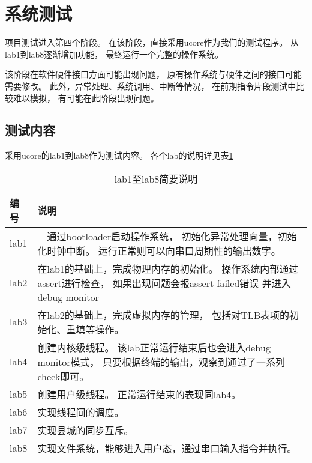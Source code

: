 \section{系统测试}
    项目测试进入第四个阶段。%
    在该阶段，直接采用ucore作为我们的测试程序。%
    从lab1到lab8逐渐增加功能，%
    最终运行一个完整的操作系统。

    该阶段在软件硬件接口方面可能出现问题，%
    原有操作系统与硬件之间的接口可能需要修改。%
    此外，异常处理、系统调用、中断等情况，%
    在前期指令片段测试中比较难以模拟，%
    有可能在此阶段出现问题。

    \subsection{测试内容}
        采用ucore的lab1到lab8作为测试内容。
        各个lab的说明详见表\ref{os_lab}
        \begin{table}[!hbp]
            \centering
            \caption{lab1至lab8简要说明}
            \label{os_lab}
            \begin{tabularx}{\textwidth}{|l|X|}
            \hline
            编号 & 说明 \\
            \hline
            lab1 &　通过bootloader启动操作系统，
                    初始化异常处理向量，初始化时钟中断。
                    运行正常则可以向串口周期性的输出数字。 \\
            \hline
            lab2 & 在lab1的基础上，完成物理内存的初始化。
                    操作系统内部通过assert进行检查，
                    如果出现问题会报assert failed错误
                    并进入debug monitor    \\
            \hline
            lab3 & 在lab2的基础上，完成虚拟内存的管理，
                    包括对TLB表项的初始化、重填等操作。 \\
            \hline
            lab4 & 创建内核级线程。
                    该lab正常运行结束后也会进入debug monitor模式，
                    只要根据终端的输出，观察到通过了一系列check即可。 \\
            \hline
            lab5 & 创建用户级线程。
                    正常运行结束的表现同lab4。 \\
            \hline
            lab6 & 实现线程间的调度。    \\
            \hline
            lab7 & 实现县城的同步互斥。   \\
            \hline
            lab8 & 实现文件系统，能够进入用户态，通过串口输入指令并执行。  \\
            \hline
            \end{tabularx}
            \end{table}

